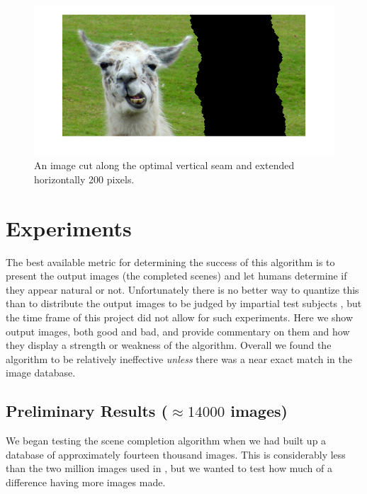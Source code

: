 \documentclass[11pt]{amsart}
\begin{document}
\begin{figure}[htbp]
\begin{center}
\includegraphics[scale=.4]{broken.png}
\caption{An image cut along the optimal vertical seam and extended horizontally 200 pixels.}
\label{llamaCut}
\end{center}
\end{figure}


\section{Experiments}

The best available metric for determining the success of this algorithm is to present the output images (the completed scenes) and let humans determine if they appear natural or not. Unfortunately there is no better way to quantize this than to distribute the output images to be judged by impartial test subjects \cite{Hays:2007}, but the time frame of this project did not allow for such experiments. Here we show output images, both good and bad, and provide commentary on them and how they display a strength or weakness of the algorithm. Overall we found the algorithm to be relatively ineffective \emph{unless} there was a near exact match in the image database.

\subsection{Preliminary Results ($\approx14000$ images)}

We began testing the scene completion algorithm when we had built up a database of approximately fourteen thousand images. This is considerably less than the two million images used in \cite{Hays:2007}, but we wanted to test how much of a difference having more images made.
\end{document}
